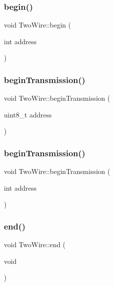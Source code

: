 \subsubsection{\texorpdfstring{begin()}{begin()}\hspace{0.1cm}{\footnotesize\ttfamily [3/3]}}
{\footnotesize\ttfamily void Two\+Wire\+::begin (\begin{DoxyParamCaption}\item[{int}]{address }\end{DoxyParamCaption})}

\mbox{\label{class_two_wire_a8d55f00ea8ac3d7427d62e0c71e95ec2}} 
\subsubsection{\texorpdfstring{begin\+Transmission()}{beginTransmission()}\hspace{0.1cm}{\footnotesize\ttfamily [1/2]}}
{\footnotesize\ttfamily void Two\+Wire\+::begin\+Transmission (\begin{DoxyParamCaption}\item[{uint8\+\_\+t}]{address }\end{DoxyParamCaption})}

\mbox{\label{class_two_wire_a4da95eb4adced5dad152344243e57aad}} 
\subsubsection{\texorpdfstring{begin\+Transmission()}{beginTransmission()}\hspace{0.1cm}{\footnotesize\ttfamily [2/2]}}
{\footnotesize\ttfamily void Two\+Wire\+::begin\+Transmission (\begin{DoxyParamCaption}\item[{int}]{address }\end{DoxyParamCaption})}

\mbox{\label{class_two_wire_a13cca813f6dd0201ac70178b18ba0946}} 
\subsubsection{\texorpdfstring{end()}{end()}}
{\footnotesize\ttfamily void Two\+Wire\+::end (\begin{DoxyParamCaption}\item[{void}]{ }\end{DoxyParamCaption})}


